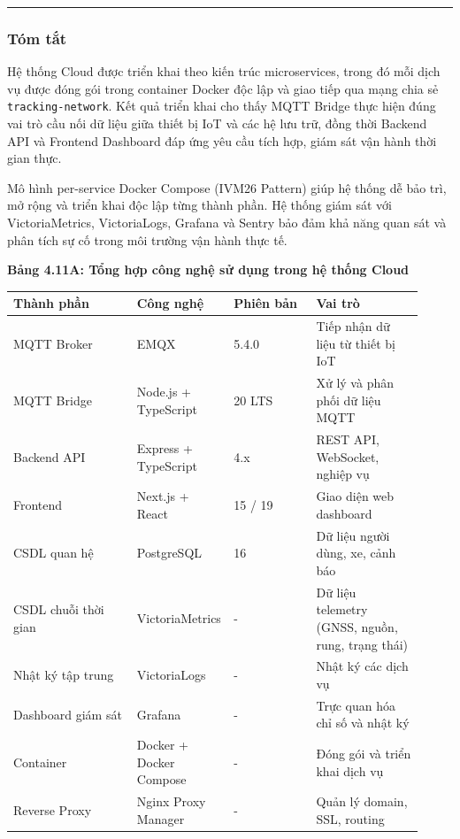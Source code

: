 \documentclass[13pt,a4paper]{extarticle}
\newcounter{none} %
\newcommand{\thesislongtableorignewline}{}
\let\thesislongtableorignewline\\
\renewcommand{\\}{\thesislongtableorignewline\hline}%
\let\\\thesislongtableorignewline
\newcommand{\thesistabletitle}[1]{%
  \begin{center}\textbf{#1}\end{center}%
}
\begin{document}
\begin{center}\rule{0.5\linewidth}{0.5pt}\end{center}

\subsubsection{Tóm tắt}\label{tuxf3m-tux1eaft}

Hệ thống Cloud được triển khai theo kiến trúc microservices, trong đó
mỗi dịch vụ được đóng gói trong container Docker độc lập và giao tiếp
qua mạng chia sẻ \texttt{tracking-network}. Kết quả triển khai cho thấy
MQTT Bridge thực hiện đúng vai trò cầu nối dữ liệu giữa thiết bị IoT và
các hệ lưu trữ, đồng thời Backend API và Frontend Dashboard đáp ứng yêu
cầu tích hợp, giám sát vận hành thời gian thực.

Mô hình per-service Docker Compose (IVM26 Pattern) giúp hệ thống dễ bảo
trì, mở rộng và triển khai độc lập từng thành phần. Hệ thống giám sát
với VictoriaMetrics, VictoriaLogs, Grafana và Sentry bảo đảm khả năng
quan sát và phân tích sự cố trong môi trường vận hành thực tế.

\thesistabletitle{Bảng 4.11A: Tổng hợp công nghệ sử dụng trong hệ thống Cloud}

{\def\LTcaptype{none} %
\begin{longtable}{|p{0.30\linewidth}|p{0.16\linewidth}|p{0.20\linewidth}|p{0.26\linewidth}|}
\hline \textbf{Thành phần} & \textbf{Công nghệ} & \textbf{Phiên bản} & \textbf{Vai trò} \\
\hline
\endhead
\hline
\endlastfoot
MQTT Broker & EMQX & 5.4.0 & Tiếp nhận dữ liệu từ thiết bị IoT \\
MQTT Bridge & Node.js + TypeScript & 20 LTS & Xử lý và phân phối dữ liệu
MQTT \\
Backend API & Express + TypeScript & 4.x & REST API, WebSocket, nghiệp
vụ \\
Frontend & Next.js + React & 15 / 19 & Giao diện web dashboard \\
CSDL quan hệ & PostgreSQL & 16 & Dữ liệu người dùng, xe, cảnh báo \\
CSDL chuỗi thời gian & VictoriaMetrics & - & Dữ liệu telemetry (GNSS,
nguồn, rung, trạng thái) \\
Nhật ký tập trung & VictoriaLogs & - & Nhật ký các dịch vụ \\
Dashboard giám sát & Grafana & - & Trực quan hóa chỉ số và nhật ký \\
Container & Docker + Docker Compose & - & Đóng gói và triển khai dịch
vụ \\
Reverse Proxy & Nginx Proxy Manager & - & Quản lý domain, SSL,
routing \\
\end{longtable}
}
\end{document}
